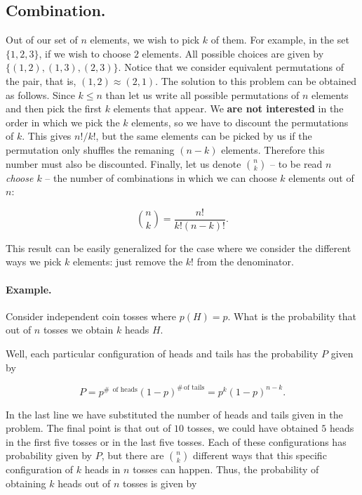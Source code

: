 \documentclass[12pt]{article}
\begin{document}
\subsection{Combination.}
Out of our set of $n$ elements, we wish to pick $k$ of them. 
For example, in the set $\{1, 2, 3\}$, if we wish to choose $2$ elements. All possible choices
are given by $\{ (1 , 2), (1 , 3), (2, 3) \}$. Notice that we consider equivalent permutations of the pair, 
that is, $(1, 2) \approx (2, 1)$.
The solution to this problem can be obtained as follows. Since $k \leq n$ than let us write all possible
permutations of $n$ elements and then pick the first $k$ elements that appear.
We \textbf{are not interested} in the order in which we pick the $k$ elements, so we have to discount
the permutations of $k$. This gives $n! / k!$, but the same elements can be picked by us if the permutation
only shuffles the remaning $(n - k)$ elements. Therefore this number must also be discounted.
Finally, let us denote ${n \choose k}$ -- to be read \textit{$n$ choose $k$} -- the number of
combinations in which we can choose $k$ elements out of $n$:

\begin{equation}
{n \choose k} = \frac{n!}{k! (n - k)!}.
\end{equation}

This result can be easily generalized for the case where we consider the different ways we pick $k$ elements:
just remove the $k!$ from the denominator.

\paragraph{Example.}
Consider independent coin tosses where $p(H) = p$. What is the probability that out of $n$ tosses
we obtain $k$ heads $H$.

Well, each particular configuration of heads and tails has the probability $P$ given by

\begin{equation}
P = p^{\# \, \mbox{ of heads}} ( 1 - p)^{\# \, \mbox{of tails}} = p^{k} (1 - p)^{n - k}.
\end{equation}

\noindent
In the last line we have substituted the number of heads and tails given in the problem.
The final point is that out of $10$ tosses, we could have obtained $5$ heads in the first five
tosses or in the last five tosses. Each of these configurations has probability given by $P$, but
there are ${n \choose k}$ different ways that this specific configuration of $k$ heads in $n$ tosses
can happen.
Thus, the probability of obtaining $k$ heads out of $n$ tosses is given by
\end{document}
